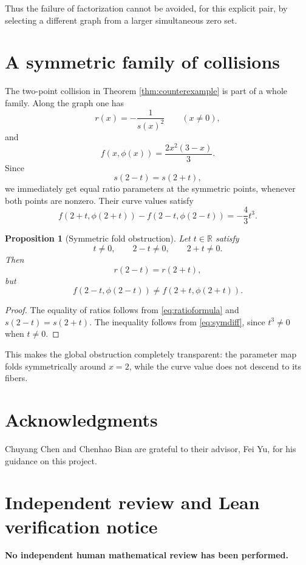 \documentclass[11pt]{article}
\newtheorem{proposition}[theorem]{Proposition}
\theoremstyle{remark}
\begin{document}
Thus the failure of factorization cannot be avoided, for this explicit pair, by selecting a different graph from a larger simultaneous zero set.

\section{A symmetric family of collisions}

The two-point collision in Theorem \ref{thm:counterexample} is part of a whole family.  Along the graph one has
\begin{equation}\label{eq:ratioformula}
 r(x)=-\frac1{s(x)^2}
 \qquad (x\ne0),
\end{equation}
and
\begin{equation}\label{eq:curvevalue}
 f(x,\phi(x))=\frac{2x^2(3-x)}3.
\end{equation}
Since
\[
 s(2-t)=s(2+t),
\]
we immediately get equal ratio parameters at the symmetric points, whenever both points are nonzero.  Their curve values satisfy
\begin{equation}\label{eq:symdiff}
 f(2+t,\phi(2+t))-f(2-t,\phi(2-t))
 =-\frac43t^3.
\end{equation}

\begin{proposition}[Symmetric fold obstruction]\label{prop:fold}
Let $t\in\mathbb R$ satisfy
\[
 t\ne0,\qquad 2-t\ne0,\qquad 2+t\ne0.
\]
Then
\[
 r(2-t)=r(2+t),
\]
but
\[
 f(2-t,\phi(2-t))\ne f(2+t,\phi(2+t)).
\]
\end{proposition}

\begin{proof}
The equality of ratios follows from \eqref{eq:ratioformula} and $s(2-t)=s(2+t)$.  The inequality follows from \eqref{eq:symdiff}, since $t^3\ne0$ when $t\ne0$.
\end{proof}

This makes the global obstruction completely transparent: the parameter map folds symmetrically around $x=2$, while the curve value does not descend to its fibers.


\section*{Acknowledgments}
Chuyang Chen and Chenhao Bian are grateful to their advisor, Fei Yu, for his guidance on this project.

\section*{Independent review and Lean verification notice}
\begingroup
\small
\begin{center}
\begin{minipage}{0.94\linewidth}
\centering
\textbf{\large No independent human mathematical review has been performed.}
\end{minipage}
\end{center}
\end{document}
